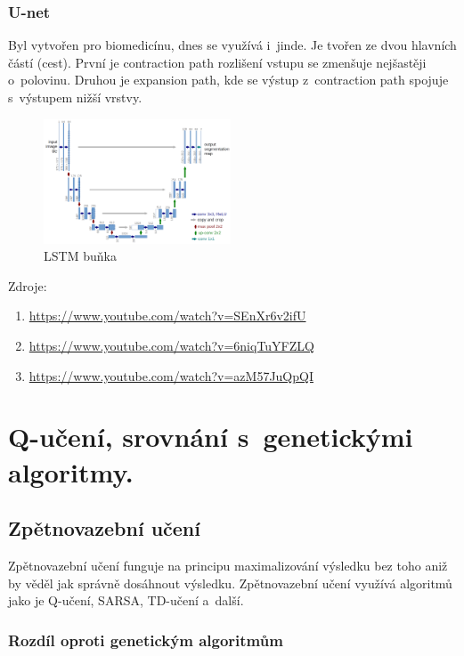 \subsubsection{U-net}

Byl vytvořen pro biomedicínu, dnes se využívá i~jinde.
Je tvořen ze dvou hlavních částí (cest).
První je contraction path rozlišení vstupu se zmenšuje nejšastěji o~polovinu.
Druhou je expansion path, kde se výstup z~contraction path spojuje s~výstupem nižší vrstvy.

\begin{figure}[h]
    \centering
	\includegraphics[height=10em]{images/09_unet.png}
    \caption{LSTM buňka}
    \label{LSTM}
\end{figure}

Zdroje:
\begin{enumerate}
    \item \url{https://www.youtube.com/watch?v=SEnXr6v2ifU}
    \item \url{https://www.youtube.com/watch?v=6niqTuYFZLQ}
    \item \url{https://www.youtube.com/watch?v=azM57JuQpQI}
\end{enumerate}


\clearpage
\section{Q-učení, srovnání s~genetickými algoritmy.}

\subsection{Zpětnovazební učení}

Zpětnovazební učení funguje na principu maximalizování výsledku bez toho aniž by věděl jak správně dosáhnout výsledku.
Zpětnovazební učení využívá algoritmů jako je Q-učení, SARSA, TD-učení a~další.

\subsubsection{Rozdíl oproti genetickým algoritmům}

